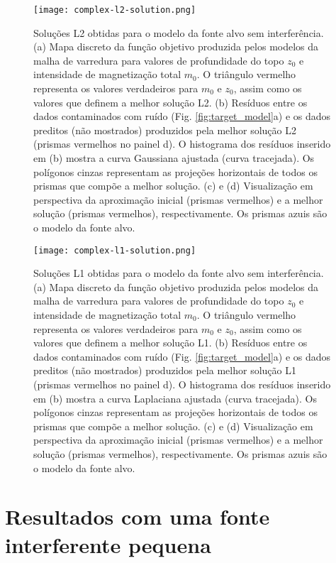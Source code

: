 \pagebreak

\begin{figure}[!htb]
	\centering
	\texttt{[image: complex-l2-solution.png]}
	\caption{Soluções L2 obtidas para o modelo da fonte alvo sem interferência. 
		(a) Mapa discreto da função objetivo produzida pelos modelos da malha de varredura para valores de profundidade do topo $z_{0}$ e intensidade de magnetização total $m_{0}$. 
		O triângulo vermelho representa os valores verdadeiros para $m_{0}$ e $z_{0}$, assim como os valores que definem a melhor solução L2.
		(b) Resíduos entre os dados contaminados com ruído (Fig. \ref{fig:target_model}a) 
		e os dados preditos (não mostrados) produzidos pela melhor solução L2 (prismas vermelhos no painel d). 
		O histograma dos resíduos inserido em (b) mostra a curva Gaussiana ajustada (curva tracejada).
		Os polígonos cinzas representam as projeções horizontais de todos os prismas que compõe a melhor solução. 
		(c) e (d) Visualização em perspectiva da aproximação inicial (prismas vermelhos) e 
		a melhor solução (prismas vermelhos), respectivamente. Os prismas azuis são o modelo da fonte alvo. 
	}
	\label{fig:target_l2_result}
\end{figure}

\begin{figure}[!htb]
	\centering
	\texttt{[image: complex-l1-solution.png]}
	\caption{Soluções L1 obtidas para o modelo da fonte alvo sem interferência. 
		(a) Mapa discreto da função objetivo produzida pelos modelos da malha de varredura para valores de profundidade do topo $z_{0}$ e intensidade de magnetização total $m_{0}$. 
		O triângulo vermelho representa os valores verdadeiros para $m_{0}$ e $z_{0}$, assim como os valores que definem a melhor solução L1.
		(b) Resíduos entre os dados contaminados com ruído (Fig. \ref{fig:target_model}a) 
		e os dados preditos (não mostrados) produzidos pela melhor solução L1 (prismas vermelhos no painel d). 
		O histograma dos resíduos inserido em (b) mostra a curva Laplaciana ajustada (curva tracejada).
		Os polígonos cinzas representam as projeções horizontais de todos os prismas que compõe a melhor solução. 
		(c) e (d) Visualização em perspectiva da aproximação inicial (prismas vermelhos) e 
		a melhor solução (prismas vermelhos), respectivamente. Os prismas azuis são o modelo da fonte alvo. 
	}
	\label{fig:target_l1_result}
\end{figure}

\section{Resultados com uma fonte interferente pequena}
\label{sec:target_source_with_small_interference}


